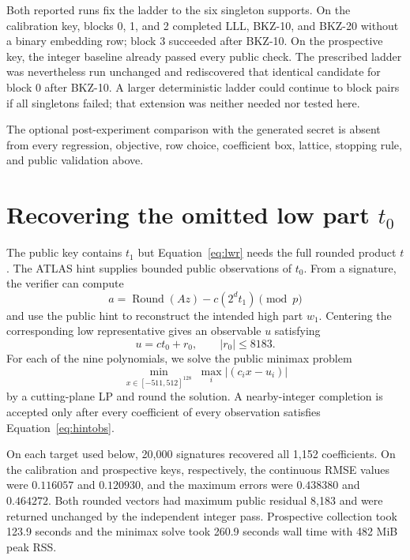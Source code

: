 \documentclass[11pt,a4paper]{article}
\begin{document}
Both reported runs fix the ladder to the six singleton supports.  On the
calibration key, blocks 0, 1, and 2 completed LLL, BKZ-10, and BKZ-20 without
a binary embedding row; block 3 succeeded after BKZ-10.  On the prospective
key, the integer baseline already passed every public check.  The prescribed
ladder was nevertheless run unchanged and rediscovered that identical
candidate for block 0 after BKZ-10.  A larger deterministic ladder could
continue to block pairs if all singletons failed; that extension was neither
needed nor tested here.

The optional post-experiment comparison with the generated secret is absent
from every regression, objective, row choice, coefficient box, lattice,
stopping rule, and public validation above.

\section{Recovering the omitted low part \texorpdfstring{$t_0$}{t0}}
\label{sec:t0}

The public key contains $t_1$ but Equation~\eqref{eq:lwr} needs the full
rounded product $t$.  The ATLAS hint supplies bounded public observations of
$t_0$.  From a signature, the verifier can compute
\begin{equation}
                 a=\operatorname{Round}(Az)-c(2^d t_1)\pmod p
\label{eq:hinta}
\end{equation}
and use the public hint to reconstruct the intended high part $w_1$.  Centering
the corresponding low representative gives an observable $u$ satisfying
\begin{equation}
                 u=ct_0+r_0,\qquad |r_0|\le8183.
\label{eq:hintobs}
\end{equation}
For each of the nine polynomials, we solve the public minimax problem
\begin{equation}
   \min_{x\in[-511,512]^{128}}\;\max_i |(c_i x-u_i)|
\label{eq:minimax}
\end{equation}
by a cutting-plane LP and round the solution.  A nearby-integer completion is
accepted only after every coefficient of every observation satisfies
Equation~\eqref{eq:hintobs}.

On each target used below, 20,000 signatures recovered all 1,152
coefficients.  On the calibration and prospective keys, respectively, the
continuous RMSE values were $0.116057$ and $0.120930$, and the maximum errors
were $0.438380$ and $0.464272$.  Both rounded vectors had maximum public
residual 8,183 and were returned unchanged by the independent integer pass.
Prospective collection took 123.9 seconds and the minimax solve took 260.9
seconds wall time with 482 MiB peak RSS.
\end{document}
